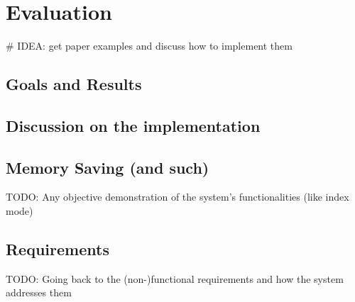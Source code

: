 \chapter{Evaluation}

# IDEA: get paper examples and discuss how to implement them

\section{Goals and Results}

\section{Discussion on the implementation}

\section{Memory Saving (and such)}

TODO: Any objective demonstration of the system's functionalities (like index mode)

\section{Requirements}

TODO: Going back to the (non-)functional requirements and how the system addresses them